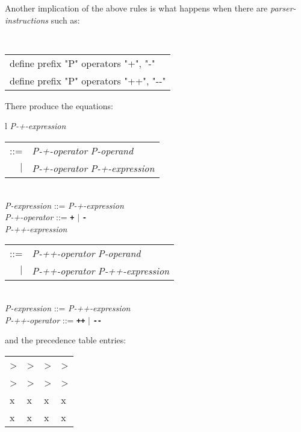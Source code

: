 \documentclass[12pt]{article}
\newcommand{\TT}[1]{{\tt \bfseries #1}}
\begin{document}
Another implication of the above rules is what happens when
there are {\em parser-instructions} such as:
\begin{center}
\tt
\begin{tabular}{l}
define prefix "P" operators "+", "-"  \\
define prefix "P" operators "++", "-{}-"  \\
\end{tabular}
\end{center}
There produce the equations:
\begin{center}
\begin{tabular}{l}
{\em P-+-expression} \begin{tabular}[t]{rl}
		     ::= & {\em P-+-operator} {\em P-operand} \\
		     $|$ & {\em P-+-operator} {\em P-+-expression} \\
		     \end{tabular} \\
{\em P-expression} ::= {\em P-+-expression} \\
{\em P-+-operator} ::= \TT{+} $|$ \TT{-} \\
{\em P-++-expression} \begin{tabular}[t]{rl}
		     ::= & {\em P-++-operator} {\em P-operand} \\
		     $|$ & {\em P-++-operator} {\em P-++-expression} \\
		     \end{tabular} \\
{\em P-expression} ::= {\em P-++-expression} \\
{\em P-++-operator} ::= \TT{++} $|$ \TT{-{}-} \\
\end{tabular}
\end{center}
and the precedence table entries:
\begin{center}
\begin{tabular}{llll}
\RX{+} > \RX{+} & \RX{+} > \RX{-} & \RX{-} > \RX{+} & \RX{-} > \RX{-} \\
\RX{++} > \RX{++} & \RX{++} > \RX{-{}-} & \RX{-{}-} > \RX{++}
                                        & \RX{-{}-} > \RX{-{}-} \\
\RX{+} x \RX{++} & \RX{+} x \RX{-{}-} & \RX{-} x \RX{++} & \RX{-} x \RX{-{}-} \\
\RX{++} x \RX{+} & \RX{++} x \RX{-} & \RX{-{}-} x \RX{+} & \RX{-{}-} x \RX{-} \\
\end{tabular}
\end{center}
\end{document}
